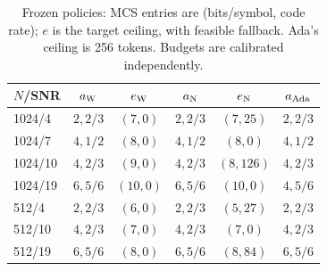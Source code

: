 \begin{table}[t]
\caption{Frozen policies: MCS entries are (bits/symbol, code rate); $e$ is the target ceiling, with feasible fallback. Ada's ceiling is 256 tokens. Budgets are calibrated independently.}
\label{tab:policies}\centering\footnotesize\setlength{\tabcolsep}{2.5pt}
\begin{tabular}{@{}lccccc@{}}\toprule
$N$/SNR & $a_{\rm W}$ & $e_{\rm W}$ & $a_{\rm N}$ & $e_{\rm N}$ & $a_{\rm Ada}$\\\midrule
1024/4 & $2,2/3$ & $(7,0)$ & $2,2/3$ & $(7,25)$ & $2,2/3$\\
1024/7 & $4,1/2$ & $(8,0)$ & $4,1/2$ & $(8,0)$ & $4,1/2$\\
1024/10 & $4,2/3$ & $(9,0)$ & $4,2/3$ & $(8,126)$ & $4,2/3$\\
1024/19 & $6,5/6$ & $(10,0)$ & $6,5/6$ & $(10,0)$ & $4,5/6$\\
512/4 & $2,2/3$ & $(6,0)$ & $2,2/3$ & $(5,27)$ & $2,2/3$\\
512/10 & $4,2/3$ & $(7,0)$ & $4,2/3$ & $(7,0)$ & $4,2/3$\\
512/19 & $6,5/6$ & $(8,0)$ & $6,5/6$ & $(8,84)$ & $6,5/6$\\
\bottomrule\end{tabular}\end{table}
